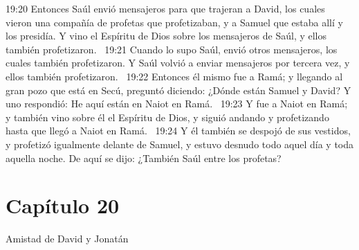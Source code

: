 19:20 Entonces Saúl envió mensajeros para que trajeran a David, los cuales vieron una compañía de profetas que profetizaban, y a Samuel que estaba allí y los presidía. Y vino el Espíritu de Dios sobre los mensajeros de Saúl, y ellos también profetizaron.  
19:21 Cuando lo supo Saúl, envió otros mensajeros, los cuales también profetizaron. Y Saúl volvió a enviar mensajeros por tercera vez, y ellos también profetizaron.  
19:22 Entonces él mismo fue a Ramá; y llegando al gran pozo que está en Secú, preguntó diciendo: ¿Dónde están Samuel y David? Y uno respondió: He aquí están en Naiot en Ramá.  
19:23 Y fue a Naiot en Ramá; y también vino sobre él el Espíritu de Dios, y siguió andando y profetizando hasta que llegó a Naiot en Ramá.  
19:24 Y él también se despojó de sus vestidos, y profetizó igualmente delante de Samuel, y estuvo desnudo todo aquel día y toda aquella noche. De aquí se dijo: ¿También Saúl entre los profetas? 
\section*{Capítulo 20}
Amistad de David y Jonatán  

